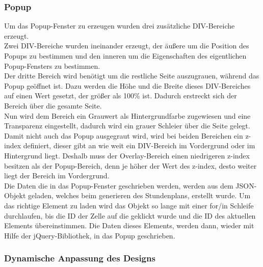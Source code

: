\subsubsection{Popup}

Um das Popup-Fenster zu erzeugen wurden drei zusätzliche DIV-Bereiche erzeugt.\\
Zwei DIV-Bereiche wurden ineinander erzeugt, der äußere um die Position des Popups zu bestimmen und den inneren um die Eigenschaften des eigentlichen Popup-Fensters zu bestimmen.\\





Der dritte Bereich wird benötigt um die restliche Seite auszugrauen, während das Popup geöffnet ist. Dazu werden die Höhe und die Breite dieses DIV-Bereiches auf einen Wert gesetzt, der größer als 100\% ist. Dadurch erstreckt sich der Bereich über die gesamte Seite.\\
Nun wird dem  Bereich ein Grauwert als Hintergrundfarbe zugewiesen und eine Transparenz eingestellt, dadurch wird ein grauer Schleier über die Seite gelegt.\\
Damit nicht auch das Popup ausgegraut wird, wird bei beiden Bereichen ein z-index definiert, dieser gibt an wie weit ein DIV-Bereich im Vordergrund oder im Hintergrund liegt. Deshalb muss der Overlay-Bereich einen niedrigeren z-index besitzen als der Popup-Bereich, denn je höher der Wert des z-index, desto weiter liegt der Bereich im Vordergrund.\\

Die Daten die in das Popup-Fenster geschrieben werden, werden aus dem JSON-Objekt geladen, welches beim generieren des Stundenplans, erstellt wurde. Um das richtige Element zu laden wird das Objekt so lange mit einer for/in Schleife durchlaufen, bis die ID der Zelle auf die geklickt wurde und die ID des aktuellen Elements übereinstimmen. Die Daten dieses Elements, werden dann, wieder mit Hilfe der jQuery-Bibliothek, in das Popup geschrieben.\\


\subsubsection{Dynamische Anpassung des Designs}

